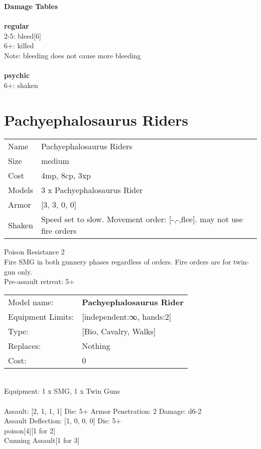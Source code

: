 {\bf Damage Tables} \\
\ \\ {\bf regular } \\
2-5: bleed[6] \\
6+: killed \\
Note: bleeding does not cause more bleeding \\
\ \\ {\bf psychic } \\
6+: shaken \\










\pagebreak\pagebreak

\section{ Pachyephalosaurus Riders }

\begin{tabular}{ll}
  Name & Pachyephalosaurus Riders \\
  Size & medium\\
  Cost & 4mp, 8cp, 3xp\\
  Models & 3 x Pachyephalosaurus Rider\\
  Armor & [3, 3, 0, 0]\\
  Shaken & Speed set to slow. Movement order: [-,-,flee]. may not use fire orders\\
\end{tabular}

\noindent Poison Resistance 2\\ 
Fire SMG in both gunnery phases regardless of orders. Fire orders are for twin-gun only.\\ 
Pre-assault retreat: 5+\\ 


\noindent
\begin{tabular}{ll}
Model name: &{\bf Pachyephalosaurus Rider } \\
Equipment Limits: &[independent:∞, hands:2] \\
Type: &[Bio, Cavalry, Walks] \\
Replaces: &Nothing \\
Cost: & 0\\
\end{tabular}
\ \\
Equipment: 1 x SMG, 1 x Twin Guns \\
\ \\
Assault: [2, 1, 1, 1] Die: 5+ Armor Penetration: 2 Damage: d6-2 \\
Assault Deflection: [1, 0, 0, 0] Die: 5+\\
\indent poison[4][1 for 2]\\ 
Cunning Assault[1 for 3]\\ 
 
